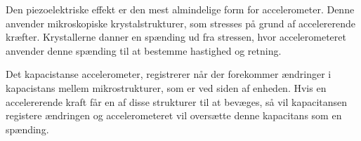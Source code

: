Den piezoelektriske effekt er den mest almindelige form for accelerometer. Denne anvender mikroskopiske krystalstrukturer, som stresses på grund af accelererende kræfter. Krystallerne danner en spænding ud fra stressen, hvor accelerometeret anvender denne spænding til at bestemme hastighed og retning. \citep{Goodrich2013}

Det kapacistanse accelerometer, registrerer når der forekommer ændringer i kapacistans mellem mikrostrukturer, som er ved siden af enheden. Hvis en accelererende kraft får en af disse strukturer til at bevæges, så vil kapacitansen registere ændringen og accelerometeret vil oversætte denne kapacitans som en spænding.  \citep{Goodrich2013}
